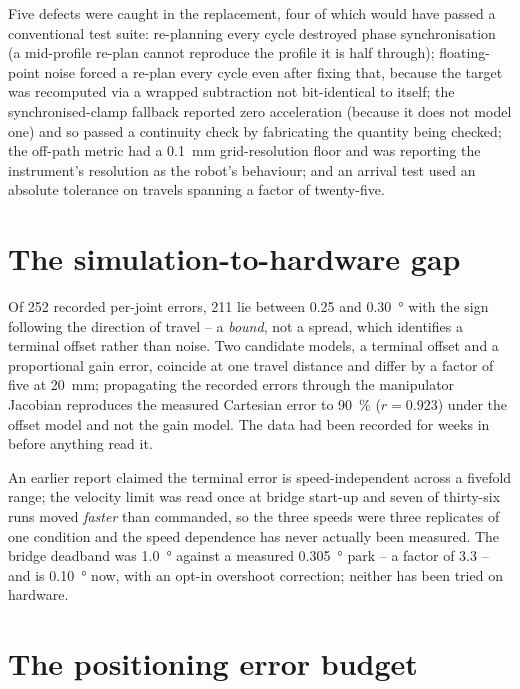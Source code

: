 Five defects were caught in the replacement, four of which would have
passed a conventional test suite: re-planning every cycle destroyed phase
synchronisation (a mid-profile re-plan cannot reproduce the profile it is
half through); floating-point noise forced a re-plan every cycle even after
fixing that, because the target was recomputed via a wrapped subtraction not
bit-identical to itself; the synchronised-clamp fallback reported zero
acceleration (because it does not model one) and so passed a continuity
check by fabricating the quantity being checked; the off-path metric had a
\SI{0.1}{\milli\metre} grid-resolution floor and was reporting the
instrument's resolution as the robot's behaviour; and an arrival test used
an absolute tolerance on travels spanning a factor of twenty-five.

\section{The simulation-to-hardware gap}
\label{sec:sim-to-real}

Of 252 recorded per-joint errors, 211 lie between \SI{0.25}{} and
\SI{0.30}{\degree} with the sign following the direction of travel -- a
\emph{bound}, not a spread, which identifies a terminal offset rather than
noise. Two candidate models, a terminal offset and a proportional gain
error, coincide at one travel distance and differ by a factor of five at
\SI{20}{\milli\metre}; propagating the recorded errors through the
manipulator Jacobian reproduces the measured Cartesian error to
\SI{90}{\percent} ($r=\num{0.923}$) under the offset model and not the gain
model. The data had been recorded for weeks in
 before
anything read it.

An earlier report claimed the terminal error is speed-independent across a
fivefold range; the velocity limit was read once at bridge start-up and
seven of thirty-six runs moved \emph{faster} than commanded, so the three
speeds were three replicates of one condition and the speed dependence has
never actually been measured. The bridge deadband was \SI{1.0}{\degree}
against a measured \SI{0.305}{\degree} park -- a factor of 3.3 -- and is
\SI{0.10}{\degree} now, with an opt-in overshoot correction; neither has
been tried on hardware.

\section{The positioning error budget}

